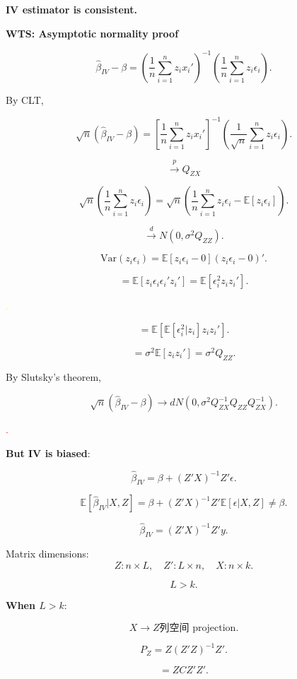 \documentclass[12pt, oneside]{article}
\begin{document}
\textbf{IV estimator is consistent.}

\textbf{WTS: Asymptotic normality proof}

\[
\hat{\beta}_{IV} - \beta = \left( \frac{1}{n} \sum_{i=1}^{n} z_i x_i' \right)^{-1} \left( \frac{1}{n} \sum_{i=1}^{n} z_i \epsilon_i \right).
\]

By CLT,

\[
\sqrt{n} (\hat{\beta}_{IV} - \beta) = \left[ \frac{1}{n} \sum_{i=1}^{n} z_i x_i' \right]^{-1} \left( \frac{1}{\sqrt{n}} \sum_{i=1}^{n} z_i \epsilon_i \right).
\]

\[
\xrightarrow{p} Q_{ZX}
\]

\[
\sqrt{n} \left( \frac{1}{n} \sum_{i=1}^{n} z_i \epsilon_i \right) = \sqrt{n} \left( \frac{1}{n} \sum_{i=1}^{n} z_i \epsilon_i - \mathbb{E}[z_i \epsilon_i] \right).
\]

\[
\xrightarrow{d} N(0, \sigma^2 Q_{ZZ}).
\]

\[
\text{Var}(z_i \epsilon_i) = \mathbb{E} [ z_i \epsilon_i - 0 ] (z_i \epsilon_i - 0)'.
\]

\[
= \mathbb{E} [ z_i \epsilon_i \epsilon_i' z_i' ] = \mathbb{E} [ \epsilon_i^2 z_i z_i' ].
\]

\textcolor{yellow}{.}

\[
= \mathbb{E} [ \mathbb{E} [\epsilon_i^2 | z_i] z_i z_i' ].
\]

\[
= \sigma^2 \mathbb{E} [ z_i z_i' ] = \sigma^2 Q_{ZZ}.
\]

By Slutsky's theorem,

\[
\sqrt{n} (\hat{\beta}_{IV} - \beta) \rightarrow d N(0, \sigma^2 Q_{ZX}^{-1} Q_{ZZ} Q_{ZX}^{-1}).
\]

\textcolor{red}{.}

\textbf{But IV is biased}:

\[
\hat{\beta}_{IV} = \beta + (Z'X)^{-1} Z' \epsilon.
\]

\[
\mathbb{E}[\hat{\beta}_{IV} | X, Z] = \beta + (Z'X)^{-1} Z' \mathbb{E}[\epsilon | X, Z] \neq \beta.
\]

\[
\hat{\beta}_{IV} = (Z'X)^{-1} Z' y.
\]

Matrix dimensions:
\[
Z: n \times L, \quad Z': L \times n, \quad X: n \times k.
\]

\[
L > k.
\]

\textbf{When \( L > k \)}:

\[
X \to Z \text{列空间 projection}.
\]

\[
P_Z = Z (Z'Z)^{-1} Z'.
\]

\[
= Z C Z' Z'.
\]
\end{document}
